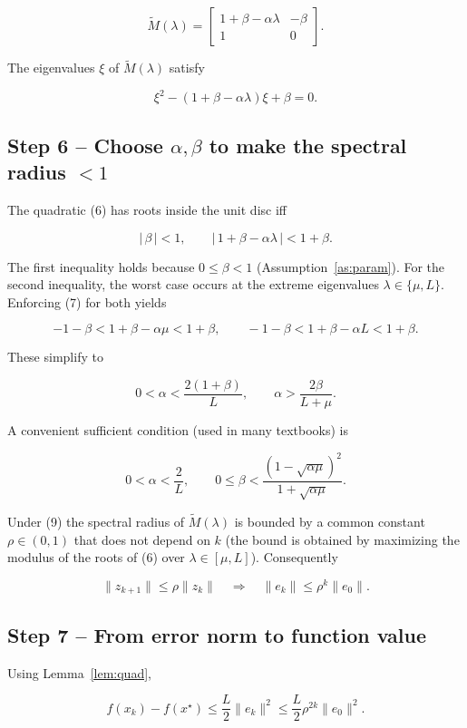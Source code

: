 \documentclass{article}
\begin{document}
\[
\tilde M(\lambda)=
\begin{bmatrix}
1+\beta-\alpha\lambda & -\beta\\
1                    & 0
\end{bmatrix}.
\tag{5}
\]

The eigenvalues $\xi$ of $\tilde M(\lambda)$ satisfy  

\[
\xi^{2}-(1+\beta-\alpha\lambda)\xi+\beta=0.
\tag{6}
\]

\subsection*{Step 6 – Choose $\alpha,\beta$ to make the spectral radius $<1$}
The quadratic (6) has roots inside the unit disc iff  

\[
|\,\beta\,|<1,\qquad
|\,1+\beta-\alpha\lambda\,|<1+\beta .
\tag{7}
\]

The first inequality holds because $0\le\beta<1$ (Assumption~\ref{as:param}).
For the second inequality, the worst case occurs at the extreme
eigenvalues $\lambda\in\{\mu,L\}$.  Enforcing (7) for both yields  

\[
-1-\beta < 1+\beta-\alpha\mu < 1+\beta,
\qquad
-1-\beta < 1+\beta-\alpha L   < 1+\beta .
\]

These simplify to  

\[
0<\alpha<\frac{2(1+\beta)}{L},
\qquad
\alpha > \frac{2\beta}{L+\mu}.
\tag{8}
\]

A convenient sufficient condition (used in many textbooks) is  

\[
0<\alpha<\frac{2}{L},
\qquad
0\le\beta<\frac{(1-\sqrt{\alpha\mu})^{2}}{1+\sqrt{\alpha\mu}} .
\tag{9}
\]

Under (9) the spectral radius of $\tilde M(\lambda)$ is bounded by a
common constant $\rho\in(0,1)$ that does not depend on $k$ (the bound is
obtained by maximizing the modulus of the roots of (6) over
$\lambda\in[\mu,L]$).  Consequently  

\[
\|z_{k+1}\|\le\rho\|z_k\|\quad\Longrightarrow\quad
\|e_k\|\le\rho^{k}\|e_0\|.
\tag{10}
\]

\subsection*{Step 7 – From error norm to function value}
Using Lemma~\ref{lem:quad},  

\[
f(x_k)-f(x^\star)\le \frac{L}{2}\|e_k\|^{2}
                 \le \frac{L}{2}\rho^{2k}\|e_0\|^{2}.
\tag{11}
\]
\end{document}
